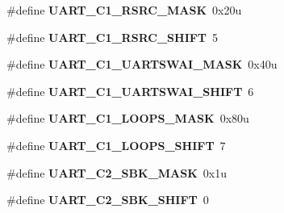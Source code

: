 \begin{DoxyCompactItemize}
\item 
\hypertarget{group___u_a_r_t___register___masks_gaaeb3cc3491cd77f71150bfa9cce03518}{}\#define {\bfseries U\+A\+R\+T\+\_\+\+C1\+\_\+\+R\+S\+R\+C\+\_\+\+M\+A\+S\+K}~0x20u\label{group___u_a_r_t___register___masks_gaaeb3cc3491cd77f71150bfa9cce03518}

\item 
\hypertarget{group___u_a_r_t___register___masks_gac773b486d570b26d17a7d522016f683a}{}\#define {\bfseries U\+A\+R\+T\+\_\+\+C1\+\_\+\+R\+S\+R\+C\+\_\+\+S\+H\+I\+F\+T}~5\label{group___u_a_r_t___register___masks_gac773b486d570b26d17a7d522016f683a}

\item 
\hypertarget{group___u_a_r_t___register___masks_ga466f5bf7b0cd3c3517da3a6c6a9baaac}{}\#define {\bfseries U\+A\+R\+T\+\_\+\+C1\+\_\+\+U\+A\+R\+T\+S\+W\+A\+I\+\_\+\+M\+A\+S\+K}~0x40u\label{group___u_a_r_t___register___masks_ga466f5bf7b0cd3c3517da3a6c6a9baaac}

\item 
\hypertarget{group___u_a_r_t___register___masks_gac7888d995fd947613eea08bdee534ffc}{}\#define {\bfseries U\+A\+R\+T\+\_\+\+C1\+\_\+\+U\+A\+R\+T\+S\+W\+A\+I\+\_\+\+S\+H\+I\+F\+T}~6\label{group___u_a_r_t___register___masks_gac7888d995fd947613eea08bdee534ffc}

\item 
\hypertarget{group___u_a_r_t___register___masks_ga08f1bbd905640d81967f9fb6d4ed8ec8}{}\#define {\bfseries U\+A\+R\+T\+\_\+\+C1\+\_\+\+L\+O\+O\+P\+S\+\_\+\+M\+A\+S\+K}~0x80u\label{group___u_a_r_t___register___masks_ga08f1bbd905640d81967f9fb6d4ed8ec8}

\item 
\hypertarget{group___u_a_r_t___register___masks_gac6beea8a7bad0b0fc3c3535f629fcf3a}{}\#define {\bfseries U\+A\+R\+T\+\_\+\+C1\+\_\+\+L\+O\+O\+P\+S\+\_\+\+S\+H\+I\+F\+T}~7\label{group___u_a_r_t___register___masks_gac6beea8a7bad0b0fc3c3535f629fcf3a}

\item 
\hypertarget{group___u_a_r_t___register___masks_ga8d243e5b3a3ece12bdeca818bacb15ee}{}\#define {\bfseries U\+A\+R\+T\+\_\+\+C2\+\_\+\+S\+B\+K\+\_\+\+M\+A\+S\+K}~0x1u\label{group___u_a_r_t___register___masks_ga8d243e5b3a3ece12bdeca818bacb15ee}

\item 
\hypertarget{group___u_a_r_t___register___masks_ga94f62ff8a45a08ae54b40da725fb245b}{}\#define {\bfseries U\+A\+R\+T\+\_\+\+C2\+\_\+\+S\+B\+K\+\_\+\+S\+H\+I\+F\+T}~0\label{group___u_a_r_t___register___masks_ga94f62ff8a45a08ae54b40da725fb245b}


\end{DoxyCompactItemize}

